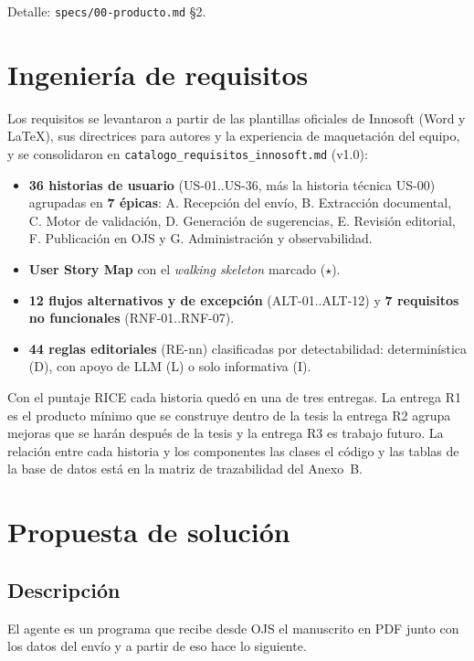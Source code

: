 Detalle: \texttt{specs/\allowbreak{}00-producto.\allowbreak{}md} §2.

\section{Ingeniería de requisitos}

Los requisitos se levantaron a partir de las plantillas oficiales de Innosoft (Word y LaTeX), sus directrices para autores y la experiencia de maquetación del equipo, y se consolidaron en \texttt{catalogo\_\allowbreak{}requisitos\_\allowbreak{}innosoft.\allowbreak{}md} (v1.0):

\begin{itemize}
  \item \textbf{36 historias de usuario} (US-01..US-36, más la historia técnica US-00) agrupadas en \textbf{7 épicas}: A. Recepción del envío, B. Extracción documental, C. Motor de validación, D. Generación de sugerencias, E. Revisión editorial, F. Publicación en OJS y G. Administración y observabilidad.
  \item \textbf{User Story Map} con el \emph{walking skeleton} marcado ($\star$).
  \item \textbf{12 flujos alternativos y de excepción} (ALT-01..ALT-12) y \textbf{7 requisitos no funcionales} (RNF-01..RNF-07).
  \item \textbf{44 reglas editoriales} (RE-nn) clasificadas por detectabilidad: determinística (D), con apoyo de LLM (L) o solo informativa (I).
\end{itemize}

Con el puntaje RICE cada historia quedó en una de tres entregas. La entrega R1 es el producto mínimo que se construye dentro de la tesis la entrega R2 agrupa mejoras que se harán después de la tesis y la entrega R3 es trabajo futuro. La relación entre cada historia y los componentes las clases el código y las tablas de la base de datos está en la matriz de trazabilidad del Anexo~B.

\section{Propuesta de solución}

\subsection{Descripción}

El agente es un programa que recibe desde OJS el manuscrito en PDF junto con los datos del envío y a partir de eso hace lo siguiente.


